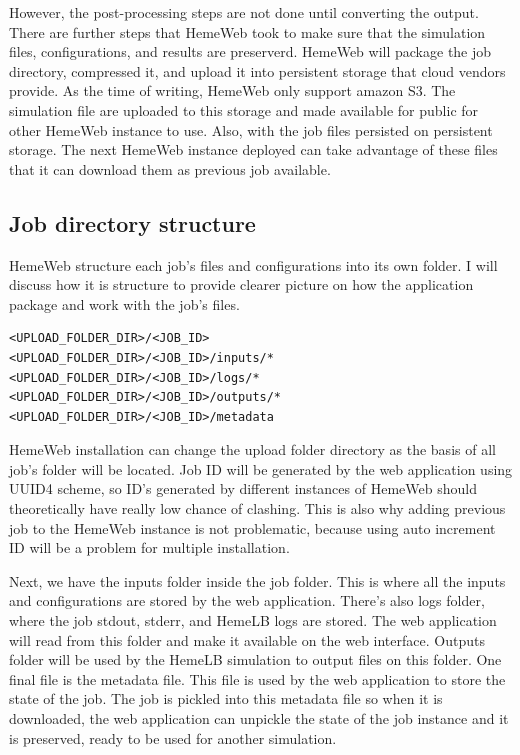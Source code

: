However, the post-processing steps are not done until converting the output. There are further steps that HemeWeb took to make sure that the simulation files, configurations, and results are preserverd. HemeWeb will package the job directory, compressed it, and upload it into persistent storage that cloud vendors provide. As the time of writing, HemeWeb only support amazon S3. The simulation file are uploaded to this storage and made available for public for other HemeWeb instance to use. Also, with the job files persisted on persistent storage. The next HemeWeb instance deployed can take advantage of these files that it can download them as previous job available.



\subsection{Job directory structure}

HemeWeb structure each job's files and configurations into its own folder. I will discuss how it is structure to provide clearer picture on how the application package and work with the job's files.

\begin{lstlisting}
<UPLOAD_FOLDER_DIR>/<JOB_ID>
<UPLOAD_FOLDER_DIR>/<JOB_ID>/inputs/*
<UPLOAD_FOLDER_DIR>/<JOB_ID>/logs/*
<UPLOAD_FOLDER_DIR>/<JOB_ID>/outputs/*
<UPLOAD_FOLDER_DIR>/<JOB_ID>/metadata
\end{lstlisting}

HemeWeb installation can change the upload folder directory as the basis of all job's folder will be located.  Job ID will be generated by the web application using UUID4 scheme, so ID's generated by different instances of HemeWeb should theoretically have really low chance of clashing. This is also why adding previous job to the HemeWeb instance is not problematic, because using auto increment ID will be a problem for multiple installation.

Next, we have the inputs folder inside the job folder. This is where all the inputs and configurations are stored by the web application. There's also logs folder, where the job stdout, stderr, and HemeLB logs are stored. The web application will read from this folder and make it available on the web interface. Outputs folder will be used by the HemeLB simulation to output files on this folder. One final file is the metadata file. This file is used by the web application to store the state of the job. The job is pickled into this metadata file so when it is downloaded, the web application can unpickle the state of the job instance and it is preserved, ready to be used for another simulation.




